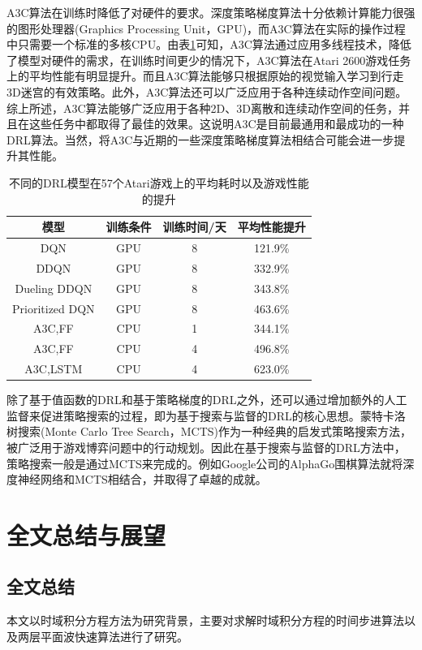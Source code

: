 \documentclass[bachelor]{thesis-uestc}
\begin{document}
	A3C算法在训练时降低了对硬件的要求。深度策略梯度算法十分依赖计算能力很强的图形处理器(Graphics Processing Unit，GPU)，而A3C算法在实际的操作过程中只需要一个标准的多核CPU。由表\ref{tb1}可知，A3C算法通过应用多线程技术，降低了模型对硬件的需求，在训练时间更少的情况下，A3C算法在Atari 2600游戏任务上的平均性能有明显提升。而且A3C算法能够只根据原始的视觉输入学习到行走3D迷宫的有效策略。此外，A3C算法还可以广泛应用于各种连续动作空间问题。综上所述，A3C算法能够广泛应用于各种2D、3D离散和连续动作空间的任务，并且在这些任务中都取得了最佳的效果。这说明A3C是目前最通用和最成功的一种DRL算法。当然，将A3C与近期的一些深度策略梯度算法相结合可能会进一步提升其性能。
	
	\begin{table}[h]
		\caption{不同的DRL模型在57个Atari游戏上的平均耗时以及游戏性能的提升}
		\label{tb1}
		\begin{tabular}{|c|c|c|c|}
			\hline
			模型 & 训练条件 & 训练时间/天 & 平均性能提升 \\
			\hline
			DQN & GPU & 8 & 121.9\% \\
			\hline
			DDQN & GPU & 8 & 332.9\% \\
			\hline
			Dueling DDQN & GPU & 8 & 343.8\% \\
			\hline
			Prioritized DQN & GPU & 8 & 463.6\% \\
			\hline
			A3C,FF & CPU & 1 & 344.1\% \\
			\hline
			A3C,FF & CPU & 4 & 496.8\% \\
			\hline
			A3C,LSTM & CPU & 4 & 623.0\% \\
			\hline
		\end{tabular}
	\end{table}
	除了基于值函数的DRL和基于策略梯度的DRL之外，还可以通过增加额外的人工监督来促进策略搜索的过程，即为基于搜索与监督的DRL的核心思想。蒙特卡洛树搜索(Monte Carlo Tree Search，MCTS)作为一种经典的启发式策略搜索方法，被广泛用于游戏博弈问题中的行动规划。因此在基于搜索与监督的DRL方法中，策略搜索一般是通过MCTS来完成的。例如Google公司的AlphaGo围棋算法就将深度神经网络和MCTS相结合，并取得了卓越的成就。
	
	
	\chapter{全文总结与展望}
	
	\section{全文总结}
	本文以时域积分方程方法为研究背景，主要对求解时域积分方程的时间步进算法以及两层平面波快速算法进行了研究。
	
\end{document}
